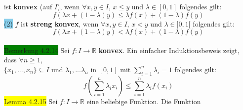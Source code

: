 \documentclass[landscape, 10pt]{article}
\newcommand{\R}{\mathbb{R}}
\begin{document}
\begin{multicols}{3}
                            ist \textbf{konvex} (auf 
                            \textcolor{NavyBlue}{$I$}), wenn 
                            \textcolor{NavyBlue}{
                            $\forall x,y\in I,\,x\leqslant y$ 
                            und $\lambda\in[0,1]$}
                            folgendes gilt: 
                            \begin{equation*}
                                   f(\lambda x+(1-\lambda)y)
                                   \leqslant\lambda f(x)
                                   +(1-\lambda)f(y) 
                            \end{equation*}
                     \colorbox{SkyBlue}{(2)} 
                            \textcolor{NavyBlue}{$f$} ist 
                            \textbf{streng konvex}, 
                            wenn \textcolor{NavyBlue}{
                            $\forall x,y\in I,\,x<y$}
                            und \textcolor{NavyBlue}{
                            $\lambda\in]0,1[$} 
                            folgendes gilt: 
                            \begin{equation*}
                                   f(\lambda x+(1-\lambda)y)
                                   <\lambda f(x)+(1-\lambda)f(y)
                            \end{equation*}\\
              \colorbox{green}{Bemerkung 4.2.14} 
                     Sei \textcolor{NavyBlue}{
                     $f:I\longrightarrow\R$} 
                     \textbf{konvex}. Ein einfacher 
                     Induktionsbeweis zeigt, dass
                     \textcolor{NavyBlue}{
                     $\forall n\geqslant1$},\\
                     \textcolor{NavyBlue}{$\{x_1,...,x_n\}
                     \subseteq I$} 
                     und \textcolor{NavyBlue}{
                     $\lambda_1,...\lambda_n$} in 
                     \textcolor{NavyBlue}{$[0,1]$} mit 
                     \textcolor{NavyBlue}{
                     $\sum_{i=1}^n\lambda_i=1$}
                     folgendes gilt: 
                     \begin{equation*}
                            f(\sum_{i=1}^n\lambda_i x_i)
                            \leqslant\sum_{i=1}^n\lambda_if(x_i)
                     \end{equation*}
              \colorbox{yellow}{Lemma 4.2.15} 
                     Sei \textcolor{NavyBlue}{
                     $f:I\longrightarrow\R$} 
                     eine beliebige Funktion. Die Funktion 

\end{multicols}
\end{document}
